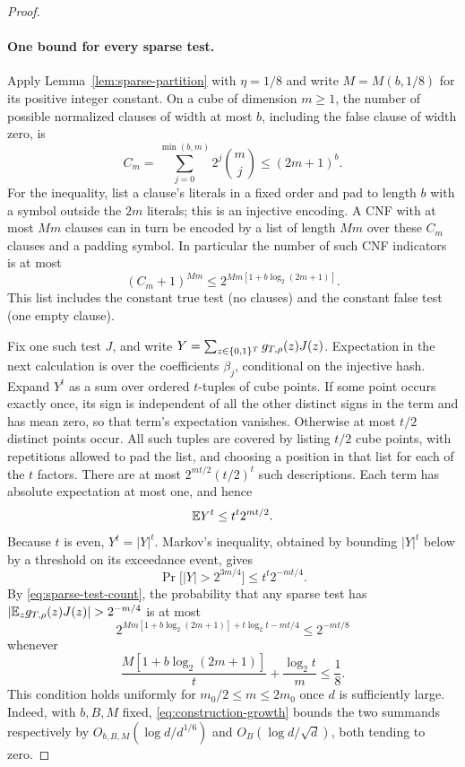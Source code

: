 \begin{proof}
\paragraph{One bound for every sparse test.}
Apply Lemma~\ref{lem:sparse-partition} with $\eta=1/8$ and write
$M=M(b,1/8)$ for its positive integer constant.  On a cube of dimension
$m\ge1$, the number of possible normalized clauses of width at most $b$,
including the false clause of width zero, is
\[
 C_m=\sum_{j=0}^{\min(b,m)}2^j\binom mj\le(2m+1)^b.
\]
For the inequality, list a clause's literals in a fixed order and pad
to length $b$ with a symbol outside the $2m$ literals; this is an
injective encoding.  A CNF with at most $Mm$ clauses can in turn be
encoded by a list of length $Mm$ over these $C_m$ clauses and a padding
symbol.  In particular the number of such CNF indicators is at most
\begin{equation}\label{eq:sparse-test-count}
 (C_m+1)^{Mm}
 \le 2^{Mm[1+b\log_2(2m+1)]}.
\end{equation}
This list includes the constant true test (no clauses) and the constant
false test (one empty clause).

Fix one such test $J$, and write
$Y=\sum_{z\in\{0,1\}^T}g_{T,\rho}(z)J(z)$.  Expectation in the next
calculation is over the coefficients $\beta_j$, conditional on the injective
hash.  Expand $Y^t$ as a sum over ordered $t$-tuples of cube points.
If some point occurs exactly once, its sign is independent of all the
other distinct signs in the term and has mean zero, so that term's
expectation vanishes.  Otherwise at most $t/2$ distinct points occur.
All such tuples are covered by listing $t/2$ cube points, with repetitions
allowed to pad the list, and choosing a position in that list for each
of the $t$ factors.  There are at most
$2^{mt/2}(t/2)^t$ such descriptions.  Each term has absolute expectation
at most one, and hence
\begin{equation}\label{eq:even-moment}
 \mathbb E Y^t\le t^t2^{mt/2}.
\end{equation}
Because $t$ is even, $Y^t=|Y|^t$.  Markov's inequality, obtained by
bounding $|Y|^t$ below by a threshold on its exceedance event, gives
\begin{equation}\label{eq:single-test-tail}
 \Pr\bigl[|Y|>2^{3m/4}\bigr]
 \le t^t2^{-mt/4}.
\end{equation}
By \eqref{eq:sparse-test-count}, the probability that any sparse test
has $|\E_z g_{T,\rho}(z)J(z)|>2^{-m/4}$ is at most
\begin{equation}\label{eq:all-sparse-tail}
 2^{Mm[1+b\log_2(2m+1)]+t\log_2t-mt/4}
 \le2^{-mt/8}
\end{equation}
whenever
\begin{equation}\label{eq:sparse-union-condition}
 \frac{M[1+b\log_2(2m+1)]}{t}
 +\frac{\log_2t}{m}\le\frac18.
\end{equation}
This condition holds uniformly for $m_0/2\le m\le2m_0$ once $d$ is
sufficiently large.  Indeed, with $b,B,M$ fixed,
\eqref{eq:construction-growth} bounds the two summands respectively by
$O_{b,B,M}(\log d/d^{1/6})$ and $O_B(\log d/\sqrt d)$, both tending
to zero.


\end{proof}
